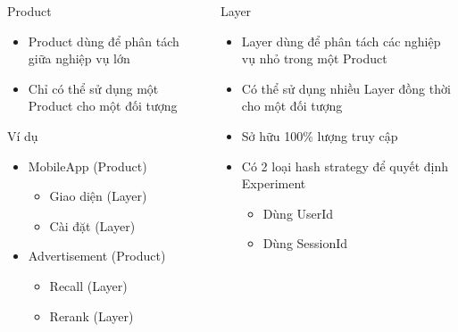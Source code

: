 \begin{frame}
	\begin{columns}
		\begin{column}{0.5\textwidth}
			\begin{block}{Product}
				\begin{itemize}
					\item Product dùng để phân tách giữa nghiệp vụ lớn
					\item Chỉ có thể sử dụng một Product cho một đối tượng
				\end{itemize}
			\end{block}
			\begin{block}{Ví dụ}
				\begin{itemize}
					\item MobileApp (Product)
					      \begin{itemize}
						      \item Giao diện (Layer)
						      \item Cài đặt (Layer)
					      \end{itemize}
					\item Advertisement (Product)
					      \begin{itemize}
						      \item Recall (Layer)
						      \item Rerank (Layer)
					      \end{itemize}
				\end{itemize}
			\end{block}
		\end{column}
		\begin{column}{0.5\textwidth}
			\begin{block}{Layer}
				\begin{itemize}
					\item Layer dùng để phân tách các nghiệp vụ nhỏ trong một Product
					\item Có thể sử dụng nhiều Layer đồng thời cho một đối tượng
					\item Sở hữu 100\% lượng truy cập
					\item Có 2 loại hash strategy để quyết định Experiment
					      \begin{itemize}
						      \item Dùng UserId
						      \item Dùng SessionId
					      \end{itemize}
				\end{itemize}
			\end{block}
		\end{column}
	\end{columns}
\end{frame}

